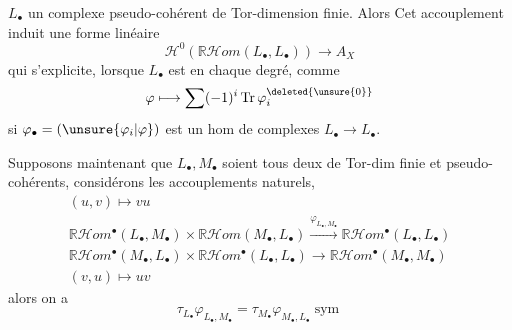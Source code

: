 $L_\bullet$ un complexe pseudo-cohérent de Tor-dimension
finie. Alors
Cet accouplement induit une forme linéaire
\[
\mathcal H^0(\mathbb R\mathcal Hom(L_\bullet,L_\bullet))\longrightarrow A_X
\]
qui s'explicite, lorsque $L_\bullet$ est  en chaque
degré, comme
\[
\varphi\longmapsto\sum(-1)^i\operatorname{Tr}\varphi_i^{\deleted{\unsure{0}}}
\]
si $\varphi_\bullet=(\unsure{\varphi_i|\varphi})$ est  un hom de
complexes $L_\bullet\longrightarrow L_\bullet$.
\deleted{[Regardons en effet}

Supposons maintenant que $L_\bullet,M_\bullet$
soient tous deux de Tor-dim finie
et pseudo-cohérents, considérons les accouplements
naturels,
\[
\begin{gathered}
(u,v)\longmapsto vu\\
\mathbb R\mathcal Hom^\bullet(L_\bullet,M_\bullet)\times\mathbb R\mathcal Hom(M_\bullet,L_\bullet)\xrightarrow{\varphi_{L_\bullet,M_\bullet}}\mathbb R\mathcal Hom^\bullet(L_\bullet,L_\bullet)\\
\mathbb R\mathcal Hom^\bullet(M_\bullet,L_\bullet)\times\mathbb R\mathcal Hom^\bullet(L_\bullet,L_\bullet)\longrightarrow\mathbb R\mathcal Hom^\bullet(M_\bullet,M_\bullet)\\
(v,u)\longmapsto uv
\end{gathered}
\]
alors  on a
\[
\tau_{L_\bullet}\varphi_{L_\bullet,M_\bullet}=\tau_{M_\bullet}\varphi_{M_\bullet,L_\bullet}\operatorname{sym}
\]
